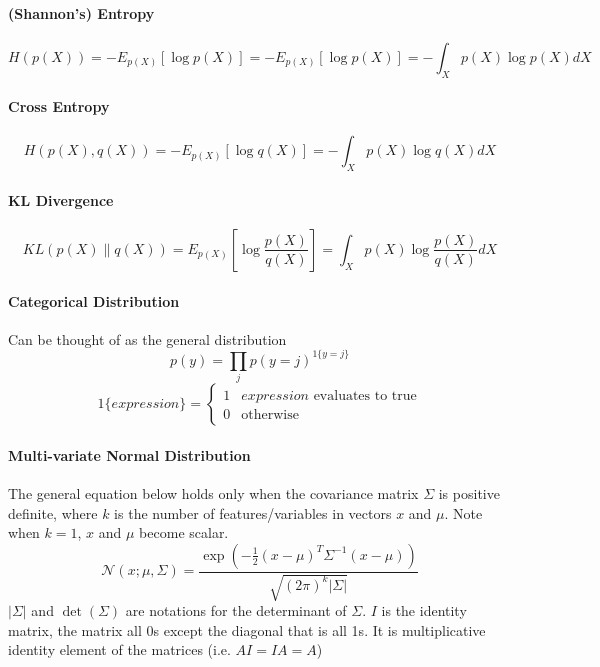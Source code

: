 \documentclass{article}
\numberwithin{equation}{subsection}
\begin{document}
\paragraph{(Shannon's) Entropy}
\begin{equation}
H(p(X)) = -E_{p(X)}[\log p(X)] = -E_{p(X)}[\log p(X)] = -\int_X p(X)\log p(X) dX 
\end{equation}
\paragraph{Cross Entropy}
\begin{equation}
H(p(X), q(X)) = -E_{p(X)}[\log q(X)] = -\int_X p(X)\log q(X) dX   
\end{equation}
\paragraph{KL Divergence}
\begin{equation}
KL(p(X) \parallel q(X)) = E_{p(X)}[\log\frac{p(X)}{q(X)}] = \int_X p(X)\log\frac{p(X)}{q(X)} dX    
\end{equation}
\paragraph{Categorical Distribution}
Can be thought of as the general distribution
\begin{equation}
    p(y) = \prod_j p(y=j)^{1\{y=j\}}
    \label{catdist}
\end{equation}
\begin{equation}
1\{expression\} = \begin{cases}
    1 & \text{$expression$ evaluates to true}\\
    0 & \text{otherwise}
    \end{cases}
\end{equation}
\paragraph{Multi-variate Normal Distribution}
The general equation below holds only when the covariance matrix $\Sigma$ is positive definite, where $k$ is the number of features/variables in vectors $x$ and $\mu$. Note when $k=1$, $x$ and $\mu$ become scalar.
\begin{equation}
    \mathcal{N}(x; \mu, \Sigma)=\frac {\exp \left(-{\frac {1}{2}}\left(x-\mu\right)^T\Sigma^{-1}\left(x-\mu\right)\right)}{\sqrt {(2\pi )^{k}|\Sigma|}}
    \label{normal_general}
\end{equation}
$|\Sigma|$ and $\det(\Sigma)$ are notations for the determinant of $\Sigma$. $I$ is the identity matrix, the matrix all 0s except the diagonal that is all 1s. It is multiplicative identity element of the matrices (i.e. $AI = IA = A$)
\end{document}
